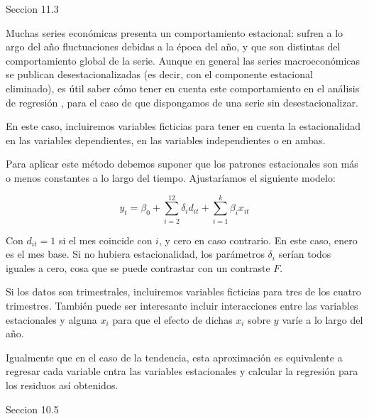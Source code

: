 Seccion 11.3

Muchas series econ\'omicas presenta un comportamiento estacional: sufren a lo argo del a\~no fluctuaciones debidas a la \'epoca del a\~no, y que son distintas del comportamiento global de la serie. Aunque en general las series macroecon\'omicas se publican desestacionalizadas (es decir, con el componente estacional eliminado), es \'util saber c\'omo tener en cuenta este comportamiento en el an\'alisis de regresi\'on , para el caso de que dispongamos de una serie sin desestacionalizar.

En este caso, incluiremos variables ficticias para tener en cuenta la estacionalidad en las variables dependientes, en las variables independientes o en ambas.

Para aplicar este m\'etodo debemos suponer que los patrones estacionales son m\'as o menos constantes a lo largo del tiempo. Ajustar\'iamos el siguiente modelo:

\[y_t=\beta_0+\sum_{i=2}^{12}\delta_id_{it}+\sum_{i=1}^k\beta_ix_{it}\]

Con $d_{it}=1$ si el mes coincide con $i$, y cero en caso contrario. En este caso, enero es el mes base. Si no hubiera estacionalidad, los par\'ametros $\delta_i$ ser\'ian todos iguales a cero, cosa que se puede contrastar con un contraste $F$.

Si los datos son trimestrales, incluiremos variables ficticias para tres de los cuatro trimestres. Tambi\'en puede ser interesante incluir interacciones entre las variables estacionales y alguna $x_i$ para que el efecto de dichas $x_i$ sobre $y$ var\'ie a lo largo del a\~no.

Igualmente que en el caso de la tendencia, esta aproximaci\'on es equivalente a regresar cada variable cntra las variables estacionales y calcular la regresi\'on para los residuos as\'i obtenidos.

Seccion 10.5